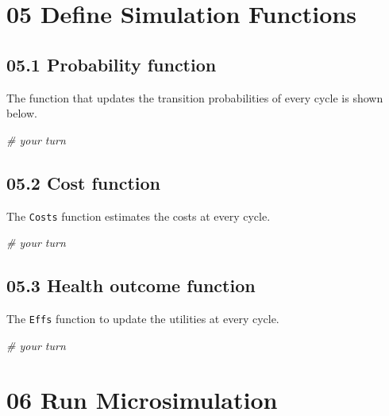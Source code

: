\documentclass[
]{article}
\newenvironment{Shaded}{\begin{snugshade}}{\end{snugshade}}
\newcommand{\CommentTok}[1]{\textcolor[rgb]{0.56,0.35,0.01}{\textit{#1}}}
\begin{document}
\hypertarget{define-simulation-functions}{%
\section{05 Define Simulation
Functions}\label{define-simulation-functions}}

\hypertarget{probability-function}{%
\subsection{05.1 Probability function}\label{probability-function}}

The function that updates the transition probabilities of every cycle is
shown below.

\begin{Shaded}
\begin{Highlighting}[]
\CommentTok{# your turn}
\end{Highlighting}
\end{Shaded}

\hypertarget{cost-function}{%
\subsection{05.2 Cost function}\label{cost-function}}

The \texttt{Costs} function estimates the costs at every cycle.

\begin{Shaded}
\begin{Highlighting}[]
\CommentTok{# your turn}
\end{Highlighting}
\end{Shaded}

\hypertarget{health-outcome-function}{%
\subsection{05.3 Health outcome
function}\label{health-outcome-function}}

The \texttt{Effs} function to update the utilities at every cycle.

\begin{Shaded}
\begin{Highlighting}[]
\CommentTok{# your turn}
\end{Highlighting}
\end{Shaded}

\hypertarget{run-microsimulation}{%
\section{06 Run Microsimulation}\label{run-microsimulation}}
\end{document}
